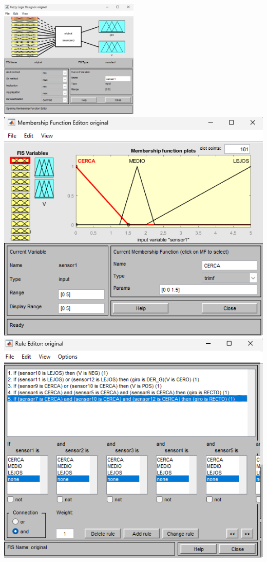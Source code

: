 \documentclass[a4paper, 12pt]{article}
\begin{document}
    \includegraphics[width=0.5\textwidth]{figures/1.png}\\
    \includegraphics[width=1\textwidth]{figures/2.png}
    \includegraphics[width=1\textwidth]{figures/3.png}\\
    
\end{document}

